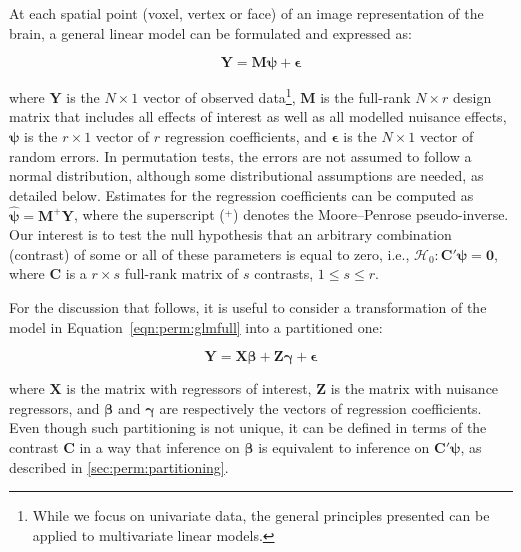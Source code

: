 At each spatial point (voxel, vertex or face) of an image representation of the brain, a general linear model \citep{Searle1971} can be formulated and expressed as:

\begin{equation}
\mathbf{Y} =  \mathbf{M} \boldsymbol{\psi} + \boldsymbol{\epsilon}
\label{eqn:perm:glmfull}
\end{equation}

\noindent
where $\mathbf{Y}$ is the $N \times 1$ vector of observed data\footnote{While we focus on univariate data, the general principles presented can be applied to multivariate linear models.}, $\mathbf{M}$ is the full-rank $N \times r$ design matrix that includes all effects of interest as well as all modelled nuisance effects, $\boldsymbol{\psi}$ is the $r \times 1$ vector of $r$ regression coefficients, and $\boldsymbol{\epsilon}$ is the $N \times 1$ vector of random errors. In permutation tests, the errors are not assumed to follow a normal distribution, although some distributional assumptions are needed, as detailed below. Estimates for the regression coefficients can be computed as $\boldsymbol{\hat{\psi}} = \mathbf{M}^{+}\mathbf{Y}$, where the superscript ($^{+}$) denotes the Moore--Penrose pseudo-inverse. Our interest is to test the null hypothesis that an arbitrary combination (contrast) of some or all of these parameters is equal to zero, i.e., $\mathcal{H}_{0} : \mathbf{C}'\boldsymbol{\psi} =\boldsymbol{0}$, where $\mathbf{C}$ is a $r \times s$ full-rank matrix of $s$ contrasts, $1 \leqslant s \leqslant r$.

For the discussion that follows, it is useful to consider a transformation of the model in Equation~\ref{eqn:perm:glmfull} into a partitioned one:

\begin{equation}
\mathbf{Y} = \mathbf{X}\boldsymbol{\beta} + \mathbf{Z}\boldsymbol{\gamma} + \boldsymbol{\epsilon}
\label{eqn:perm:glmpart}
\end{equation}

\noindent
where $\mathbf{X}$ is the matrix with regressors of interest, $\mathbf{Z}$ is the matrix with nuisance regressors, and $\boldsymbol{\beta}$ and $\boldsymbol{\gamma}$ are respectively the vectors of regression coefficients. Even though such partitioning is not unique, it can be defined in terms of the contrast $\mathbf{C}$ in a way that inference on $\boldsymbol{\beta}$ is equivalent to inference on $\mathbf{C}'\boldsymbol{\psi}$, as described in \ref{sec:perm:partitioning}.

